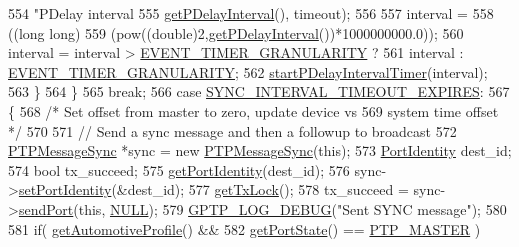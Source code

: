 \begin{DoxyCode}
554                     \textcolor{stringliteral}{"PDelay interval %
555                     \hyperlink{class_common_port_a6b594b958b0887ec332bfb61bc5981c4}{getPDelayInterval}(), timeout);
556 
557                 interval =
558                     ((\textcolor{keywordtype}{long} long)
559                      (pow((\textcolor{keywordtype}{double})2,\hyperlink{class_common_port_a6b594b958b0887ec332bfb61bc5981c4}{getPDelayInterval}())*1000000000.0));
560                 interval = interval > \hyperlink{avbts__clock_8hpp_a9fc7849128814495c7dccd06d5343baa}{EVENT\_TIMER\_GRANULARITY} ?
561                     interval : \hyperlink{avbts__clock_8hpp_a9fc7849128814495c7dccd06d5343baa}{EVENT\_TIMER\_GRANULARITY};
562                 \hyperlink{class_ether_port_a970788fa9557f7bd8f8c91ee9e9bcb11}{startPDelayIntervalTimer}(interval);
563             \}
564         \}
565         \textcolor{keywordflow}{break};
566     \textcolor{keywordflow}{case} \hyperlink{ieee1588_8hpp_a5667b805d857c6d28f83f6038a0272d3a3dba953a3ff5fdac319eca872a7fbc87}{SYNC\_INTERVAL\_TIMEOUT\_EXPIRES}:
567         \{
568             \textcolor{comment}{/* Set offset from master to zero, update device vs}
569 \textcolor{comment}{               system time offset */}
570 
571             \textcolor{comment}{// Send a sync message and then a followup to broadcast}
572             \hyperlink{class_p_t_p_message_sync}{PTPMessageSync} *sync = \textcolor{keyword}{new} \hyperlink{class_p_t_p_message_sync}{PTPMessageSync}(\textcolor{keyword}{this});
573             \hyperlink{class_port_identity}{PortIdentity} dest\_id;
574             \textcolor{keywordtype}{bool} tx\_succeed;
575             \hyperlink{class_common_port_a563117781330d95f1c6aa43837b7e4ed}{getPortIdentity}(dest\_id);
576             sync->\hyperlink{class_p_t_p_message_common_a94378ebb164e2095d3a17b393a63f2dc}{setPortIdentity}(&dest\_id);
577             \hyperlink{class_ether_port_a0b26edd5fdba45bbfe2686051882a224}{getTxLock}();
578             tx\_succeed = sync->\hyperlink{class_p_t_p_message_sync_a0c6f07200fa46634360d356ebb10dfe0}{sendPort}(\textcolor{keyword}{this}, \hyperlink{openavb__types__base__pub_8h_a070d2ce7b6bb7e5c05602aa8c308d0c4}{NULL});
579             \hyperlink{gptp__log_8hpp_ae4c6efe7c9cf6d7d3bbd28a0fd087d61}{GPTP\_LOG\_DEBUG}(\textcolor{stringliteral}{"Sent SYNC message"});
580 
581             \textcolor{keywordflow}{if}( \hyperlink{class_common_port_ad8dc4b5a985b466538d6805970eb0176}{getAutomotiveProfile}() &&
582                 \hyperlink{class_common_port_aa4182d914fdb9a27fb875d8495e0289c}{getPortState}() == \hyperlink{ptptypes_8hpp_a679431f1afc75d7bb9e972c022e53672ab4c763cac238b6403615a62111b64aa4}{PTP\_MASTER} )
}
\end{DoxyCode}
